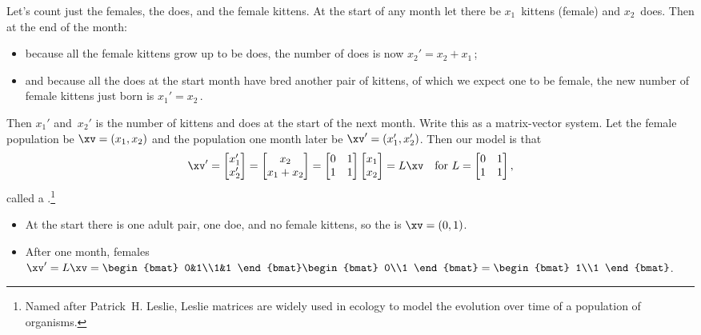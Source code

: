 \begin{example}
Let's count just the females, the does, and the female kittens.
At the start of any month let there be \(x_1\)~kittens (female) and \(x_2\)~does.
Then at the end of the month:
\begin{itemize}
\item because all the female kittens grow up to be does, the number of does is now \(x_2'=x_2+x_1\)\,;
\item and because all the does at the start month have bred another pair of kittens, of which we expect one to be female, the new number of female kittens just born is \(x_1'=x_2\)\,.
\end{itemize}
Then \(x_1'\) and~\(x_2'\) is the number of kittens and does at the start of the next month.
Write this as a matrix-vector system.
Let the female population be \(\xv=(x_1,x_2)\) and the population one month later be \(\xv'=(x_1',x_2')\).
Then our model is that
\begin{equation*}
\xv'=\begin{bmatrix} x_1'\\x_2' \end{bmatrix}
=\begin{bmatrix} x_2\\x_1+x_2 \end{bmatrix}
=\begin{bmatrix} 0&1\\1&1 \end{bmatrix}\begin{bmatrix} x_1\\x_2 \end{bmatrix}
=L\xv
\quad\text{for }L=\begin{bmatrix} 0&1\\1&1 \end{bmatrix},
\end{equation*}
called a .\footnote{%
Named after Patrick~H. Leslie, Leslie matrices are widely used in ecology to model the evolution over time of a population of organisms.}
\begin{itemize}
\item At the start there is one adult pair, one doe, and no female kittens, so the  is \(\xv=(0,1)\).
\item After one month,  females \(\xv'=L\xv=\begin{bmat} 0&1\\1&1 \end{bmat}\begin{bmat} 0\\1 \end{bmat}=\begin{bmat} 1\\1 \end{bmat}\).

\end{itemize}
\end{example}
